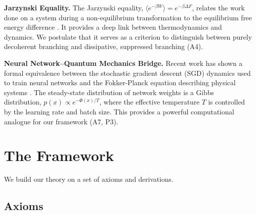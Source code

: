 \documentclass[aps,prl,twocolumn,superscriptaddress,longbibliography]{revtex4-2}
\begin{document}
\textbf{Jarzynski Equality.} The Jarzynski equality, $\langle e^{-\beta W} \rangle = e^{-\beta \Delta F}$, relates the work done on a system during a non-equilibrium transformation to the equilibrium free energy difference \cite{Jarzynski1997}. It provides a deep link between thermodynamics and dynamics. We postulate that it serves as a criterion to distinguish between purely decoherent branching and dissipative, suppressed branching (A4).

\textbf{Neural Network--Quantum Mechanics Bridge.} Recent work has shown a formal equivalence between the stochastic gradient descent (SGD) dynamics used to train neural networks and the Fokker-Planck equation describing physical systems \cite{Chaudhari2018}. The steady-state distribution of network weights is a Gibbs distribution, $p(x) \propto e^{-\Phi(x)/T}$, where the effective temperature $T$ is controlled by the learning rate and batch size. This provides a powerful computational analogue for our framework (A7, P3).

\section{The Framework}

We build our theory on a set of axioms and derivations.

\subsection{Axioms}
\end{document}
